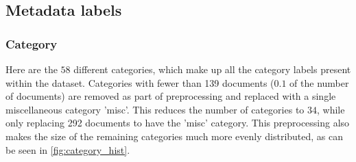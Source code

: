 \subsection{Metadata labels}\label{sec:appendix_meta_data}

\subsubsection{Category}\label{subsec:appendix_category}

Here are the $58$ different categories, which make up all the category labels present within the dataset.
Categories with fewer than 139 documents ($0.1$ of the number of documents) are removed as part of preprocessing and replaced with a single miscellaneous category 'misc'.
This reduces the number of categories to $34$, while only replacing 292 documents to have the 'misc' category.
This preprocessing also makes the size of the remaining categories much more evenly distributed, as can be seen in \autoref{fig:category_hist}.

